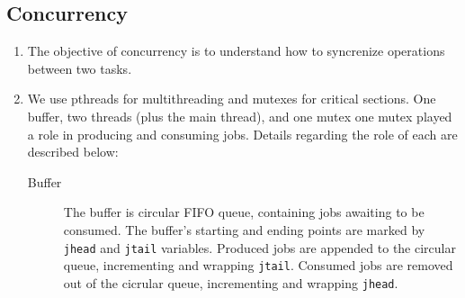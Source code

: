 \documentclass[letterpaper,10pt]{article}
\begin{document}
\subsection{Concurrency}
\begin{enumerate}
\item The objective of concurrency is to understand how to syncrenize operations between two tasks.
\item We use pthreads for multithreading and mutexes for critical sections. One buffer, two threads (plus the main thread), and one mutex one mutex played a role in producing and consuming jobs. Details regarding the role of each are described below:
\begin{description}
\item[Buffer] The buffer is circular FIFO queue, containing jobs awaiting to be consumed. The buffer's starting and ending points are marked by \texttt{jhead} and \texttt{jtail} variables. Produced jobs are appended to the circular queue, incrementing and wrapping \texttt{jtail}. Consumed jobs are removed out of the cicrular queue, incrementing and wrapping \texttt{jhead}.


\end{description}
\end{enumerate}
\end{document}
